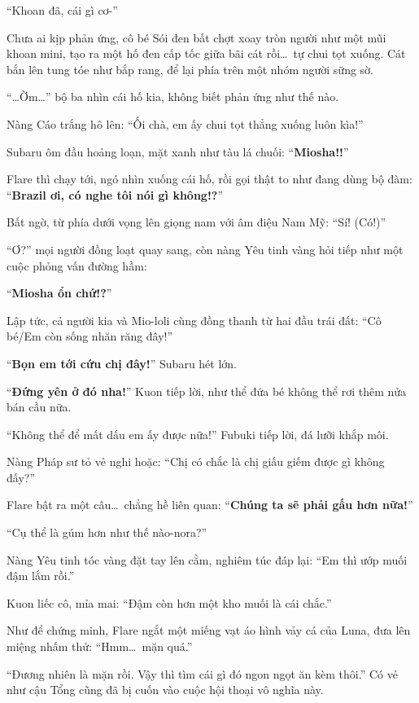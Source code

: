 \documentclass[../main.tex]{subfiles}
\begin{document}
``Khoan đã, cái gì cơ-''

Chưa ai kịp phản ứng, cô bé Sói đen bất chợt xoay tròn người như một mũi khoan mini, tạo ra một hố đen cấp tốc giữa bãi cát rồi\dots\ tự chui tọt xuống. Cát bắn lên tung tóe như bắp rang, để lại phía trên một nhóm người sững sờ.


``\dots Ờm\dots'' bộ ba nhìn cái hố kia, không biết phản ứng như thế nào.

Nàng Cáo trắng hô lên: ``Ối chà, em ấy chui tọt thẳng xuống luôn kìa!''

Subaru ôm đầu hoảng loạn, mặt xanh như tàu lá chuối: ``\textbf{Miosha!!}''

Flare thì chạy tới, ngó nhìn xuống cái hố, rồi gọi thật to như đang dùng bộ đàm: ``\textbf{Brazil ơi, có nghe tôi nói gì không!?}''

Bất ngờ, từ phía dưới vọng lên giọng nam với âm điệu Nam Mỹ: ``Sí! (Có!)''

``Ơ?'' mọi người đồng loạt quay sang, còn nàng Yêu tinh vàng hỏi tiếp như một cuộc phỏng vấn đường hầm:

``\textbf{Miosha ổn chứ!?}''

Lập tức, cả người kia và Mio-loli cùng đồng thanh từ hai đầu trái đất: ``Cô bé/Em còn sống nhăn răng đây!''

``\textbf{Bọn em tới cứu chị đây!}''  Subaru hét lớn.

``\textbf{Đứng yên ở đó nha!}'' Kuon tiếp lời, như thể đứa bé không thể rơi thêm nửa bán cầu nữa.

``Không thể để mất dấu em ấy được nữa!'' Fubuki tiếp lời, đá lưỡi khắp môi.

Nàng Pháp sư tỏ vẻ nghi hoặc: ``Chị có chắc là chị giấu giếm được gì không đấy?''

Flare bật ra một câu\dots\ chẳng hề liên quan: ``\textbf{Chúng ta sẽ phải gấu hơn nữa!}''

``Cụ thể là gúm hơn như thế nào-nora?''

Nàng Yêu tinh tóc vàng đặt tay lên cằm, nghiêm túc đáp lại: ``Em thì ướp muối đậm lắm rồi.''

Kuon liếc cô, mỉa mai: ``Đậm còn hơn một kho muối là cái chắc.''

Như để chứng minh, Flare ngắt một miếng vạt áo hình vảy cá của Luna, đưa lên miệng nhấm thử: ``Hmm\dots\ mặn quá.''

``Đương nhiên là mặn rồi. Vậy thì tìm cái gì đó ngon ngọt ăn kèm thôi.'' Có vẻ như cậu Tổng cũng đã bị cuốn vào cuộc hội thoại vô nghĩa này.
\end{document}
